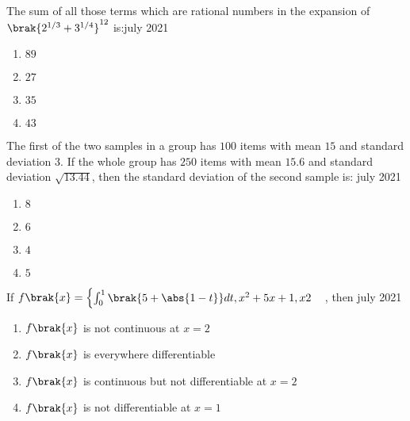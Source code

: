 \iffalse
   \title{Assignment}
   \author{EE24BTECH11034}
   \section{mcq-single}
\fi 

    \item The sum of all those terms which are rational numbers in the expansion of $\brak{2^{1/3}+3^{1/4}}^{12}$ is:\hfill{july 2021}

        \begin{multicols}{4}
        \begin{enumerate}
        \item $89$
        \item $27$
        \item $35$
        \item $43$
        \end{enumerate}
        \end{multicols}
        
    \item The first of the two samples in a group has $100$ items with mean $15$ and standard deviation $3$. If the whole group has $250$ items with mean $15.6$ and standard deviation $\sqrt{13.44}$, then the standard deviation of the second sample is: \hfill{july 2021}

        \begin{multicols}{4}
        \begin{enumerate}
        \item $8$
        \item $6$
        \item $4$
        \item $5$
        \end{enumerate}
        \end{multicols}
        
    \item If $f\brak{x}=\begin{cases}\int_{0}^{1}\brak{5+\abs{1-t}}dt,x^2+5x+1,x2\end{cases}$, then \hfill{july 2021}

        \begin{enumerate}
        \item $f\brak{x}$ is not continuous at $x=2$
        \item $f\brak{x}$ is everywhere differentiable
        \item $f\brak{x}$ is continuous but not differentiable at $x=2$
        \item $f\brak{x}$ is not differentiable at $x=1$
        \end{enumerate}
    
